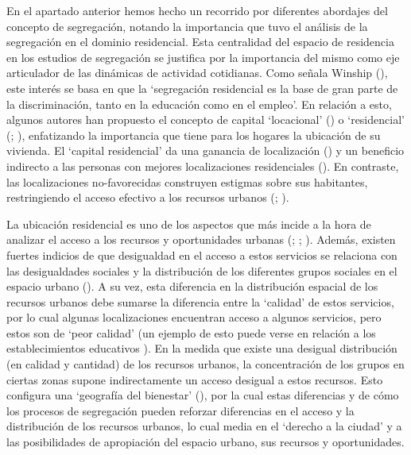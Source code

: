 \documentclass[
  spanish,
  a4paper,%
  chapterprefix=true,%
  DIV=calc,%
  twoside]{scrbook}%
\begin{document}
En el apartado anterior hemos hecho un recorrido por diferentes
abordajes del concepto de segregación, notando la importancia que tuvo
el análisis de la segregación en el dominio residencial.
Esta
centralidad del espacio de residencia en los estudios de segregación se
justifica por la importancia del mismo como eje articulador de las
dinámicas de actividad cotidianas. Como señala Winship (),
este interés se basa en que la `segregación residencial es la base de
gran parte de la discriminación, tanto en la educación como en el
empleo'. En relación a esto, algunos autores han propuesto el concepto
de capital `locacional' () o `residencial' (; ), enfatizando la importancia que tiene para los hogares la
ubicación de su vivienda. El `capital residencial' da una ganancia de
localización () y un beneficio indirecto a las personas con
mejores localizaciones residenciales (). En contraste, las
localizaciones no-favorecidas construyen estigmas sobre sus habitantes,
restringiendo el acceso efectivo a los recursos urbanos
(; ).

La ubicación residencial es uno de los aspectos que más incide a la hora
de analizar el acceso a los recursos y oportunidades urbanas
(; ; ). Además, existen fuertes
indicios de que desigualdad en el acceso a estos servicios se relaciona
con las desigualdades sociales y la distribución de los diferentes
grupos sociales en el espacio urbano (). A su vez, esta
diferencia en la distribución espacial de los recursos urbanos debe
sumarse la diferencia entre la `calidad' de estos servicios, por lo cual
algunas localizaciones encuentran acceso a algunos servicios, pero estos
son de `peor calidad' (un ejemplo de esto puede verse en relación a los
establecimientos educativos ). En la medida que existe una
desigual distribución (en calidad y cantidad) de los recursos urbanos,
la concentración de los grupos en ciertas zonas supone indirectamente un
acceso desigual a estos recursos. Esto configura una `geografía del
bienestar' (), por la cual estas diferencias y de cómo
los procesos de segregación pueden reforzar diferencias en el acceso y
la distribución de los recursos urbanos, lo cual media en el `derecho a
la ciudad' y a las posibilidades de apropiación del espacio urbano, sus
recursos y oportunidades.
\end{document}
